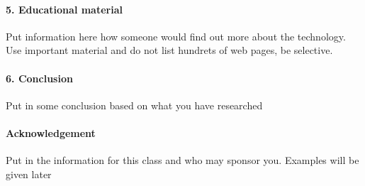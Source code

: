 \documentclass[9pt,twocolumn,twoside]{styles/osajnl}
\begin{document}
\paragraph{5. Educational material}

Put information here how someone would find out more about the
technology. Use important material and do not list hundrets of web
pages, be selective.

\paragraph{6. Conclusion}

Put in some conclusion based on what you have researched

\paragraph{Acknowledgement}

Put in the information for this class and who may sponsor
you. Examples will be given later
\end{document}
